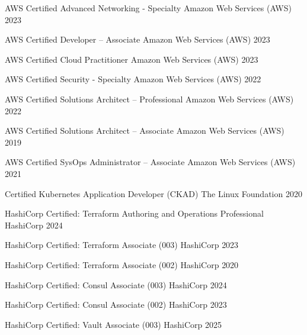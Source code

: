 
{%
\renewcommand{\acvSectionContentTopSkip}{2.5mm}%
\renewcommand{\arraystretch}{1.00}%
\begin{cvhonors}
  \cvhonor
    {AWS Certified Advanced Networking - Specialty}
    {Amazon Web Services (AWS)}
    {}
    {2023}

  \cvhonor
    {AWS Certified Developer – Associate}
    {Amazon Web Services (AWS)}
    {}
    {2023}

  \cvhonor
    {AWS Certified Cloud Practitioner}
    {Amazon Web Services (AWS)}
    {}
    {2023}

  \cvhonor
    {AWS Certified Security - Specialty}
    {Amazon Web Services (AWS)}
    {}
    {2022}

  \cvhonor
    {AWS Certified Solutions Architect – Professional}
    {Amazon Web Services (AWS)}
    {}
    {2022}

  \cvhonor
    {AWS Certified Solutions Architect – Associate}
    {Amazon Web Services (AWS)}
    {}
    {2019}

  \cvhonor
    {AWS Certified SysOps Administrator – Associate}
    {Amazon Web Services (AWS)}
    {}
    {2021}

  \cvhonor
    {Certified Kubernetes Application Developer (CKAD)}
    {The Linux Foundation}
    {}
    {2020}

  \cvhonor
    {HashiCorp Certified: Terraform Authoring and Operations Professional}
    {HashiCorp}
    {}
    {2024}

  \cvhonor
    {HashiCorp Certified: Terraform Associate (003)}
    {HashiCorp}
    {}
    {2023}

  \cvhonor
    {HashiCorp Certified: Terraform Associate (002)}
    {HashiCorp}
    {}
    {2020}

  \cvhonor
    {HashiCorp Certified: Consul Associate (003)}
    {HashiCorp}
    {}
    {2024}

  \cvhonor
    {HashiCorp Certified: Consul Associate (002)}
    {HashiCorp}
    {}
    {2023}

  \cvhonor
    {HashiCorp Certified: Vault Associate (003)}
    {HashiCorp}
    {}
    {2025}
\end{cvhonors}
}
